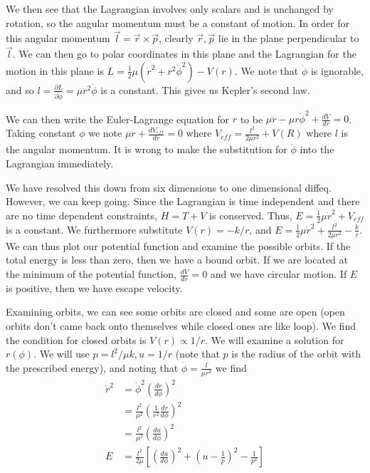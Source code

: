 \documentclass[10pt]{report}
\newcommand{\rd}[2]{\frac{d#1}{d#2}}
\newcommand{\pd}[2]{\frac{\partial #1}{\partial#2}}
\begin{document}
We then see that the Lagrangian involves only scalars and is unchanged by rotation, so the angular momentum must be a constant of motion. In order for this angular momentum $\vec{l} = \vec{r} \times \vec{p}$, clearly $\vec{r},\vec{p}$ lie in the plane perpendicular to $\vec{l}$. We can then go to polar coordinates in this plane and the Lagrangian for the motion in this plane is $L=\frac{1}{2}\mu\left( \dot{r}^2 + r^2\dot{\phi}^2\right) - V(r)$. We note that $\dot{\phi}$ is ignorable, and so $l=\pd{L}{\dot{\phi}} = \mu r^2\dot{\phi}$ is a constant. This gives us Kepler's second law.

We can then write the Euler-Lagrange equation for $r$ to be $\mu\ddot{r}-\mu r\dot{\phi}^2 + \rd{V}{r} = 0$. Taking constant $\phi$ we note $\mu\ddot{r} + \rd{V_{eff}}{r}=0$ where $V_{eff} = \frac{l^2}{2\mu r^2} + V(R)$ where $l$ is the angular momentum. It is wrong to make the substitution for $\dot{\phi}$ into the Lagrangian immediately.

We have resolved this down from six dimensions to one dimensional diffeq. However, we can keep going. Since the Lagrangian is time independent and there are no time dependent constraints, $H=T+V$ is conserved. Thus, $E = \frac{1}{2} \mu \dot{r}^2 + V_{eff}$ is a constant. We furthermore substitute $V(r) = -k/r$, and $E=\frac{1}{2}\mu \dot{r}^2 + \frac{l^2}{2\mu r^2} - \frac{k}{r}$. We can thus plot our potential function and examine the possible orbits. If the total energy is less than zero, then we have a bound orbit. If we are located at the minimum of the potential function, $\rd{V}{r} = 0$ and we have circular motion. If $E$ is positive, then we have escape velocity. 

Examining orbits, we can see some orbits are closed and some are open (open orbits don't came back onto themselves while closed ones are like loop). We find the condition for closed orbits is $V(r) \propto 1/r$. We will examine a solution for $r(\phi)$. We will use $p = l^2/\mu k, u=1/r$ (note that $p$ is the radius of the orbit with the prescribed energy), and noting that $\dot{\phi} = \frac{l}{\mu r^2}$ we find
\begin{align*}
    \dot{r}^2 &= \dot{\phi}^2 \left( \rd{r}{\phi} \right)^2 \\
    &= \frac{l^2}{\mu^2} \left( \frac{1}{r^2}\rd{r}{\phi} \right)^2\\
    &=\frac{l^2}{\mu^2}\left( \rd{u}{\phi} \right)^2\\
    E &= \frac{l^2}{2\mu}\left[  \left( \rd{u}{\phi} \right)^2 + \left( u-\frac{1}{p} \right)^2 - \frac{1}{p^2}\right]
\end{align*}
\end{document}
